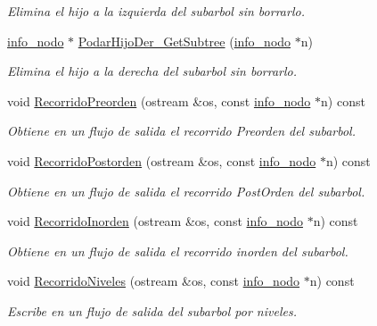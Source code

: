 \begin{DoxyCompactItemize}
\begin{DoxyCompactList}\small\item\em Elimina el hijo a la izquierda del subarbol sin borrarlo. \end{DoxyCompactList}\item 
\hyperlink{structArbolBinario_1_1info__nodo}{info\+\_\+nodo} $\ast$ \hyperlink{classArbolBinario_a4cb0bca4695c076648c41e968e7dae48}{Podar\+Hijo\+Der\+\_\+\+Get\+Subtree} (\hyperlink{structArbolBinario_1_1info__nodo}{info\+\_\+nodo} $\ast$n)
\begin{DoxyCompactList}\small\item\em Elimina el hijo a la derecha del subarbol sin borrarlo. \end{DoxyCompactList}\item 
void \hyperlink{classArbolBinario_a1a7dd97d706bfcf3c60a4cca1352f79c}{Recorrido\+Preorden} (ostream \&os, const \hyperlink{structArbolBinario_1_1info__nodo}{info\+\_\+nodo} $\ast$n) const
\begin{DoxyCompactList}\small\item\em Obtiene en un flujo de salida el recorrido Preorden del subarbol. \end{DoxyCompactList}\item 
void \hyperlink{classArbolBinario_a84f79da821dfe396411e9a3145222199}{Recorrido\+Postorden} (ostream \&os, const \hyperlink{structArbolBinario_1_1info__nodo}{info\+\_\+nodo} $\ast$n) const
\begin{DoxyCompactList}\small\item\em Obtiene en un flujo de salida el recorrido Post\+Orden del subarbol. \end{DoxyCompactList}\item 
void \hyperlink{classArbolBinario_a072dec8f8e0f43d3e4ec295702a287ec}{Recorrido\+Inorden} (ostream \&os, const \hyperlink{structArbolBinario_1_1info__nodo}{info\+\_\+nodo} $\ast$n) const
\begin{DoxyCompactList}\small\item\em Obtiene en un flujo de salida el recorrido inorden del subarbol. \end{DoxyCompactList}\item 
void \hyperlink{classArbolBinario_a4030c86c360d2b07538ed03680d3fb89}{Recorrido\+Niveles} (ostream \&os, const \hyperlink{structArbolBinario_1_1info__nodo}{info\+\_\+nodo} $\ast$n) const
\begin{DoxyCompactList}\small\item\em Escribe en un flujo de salida del subarbol por niveles. \end{DoxyCompactList}\item 

\end{DoxyCompactItemize}
